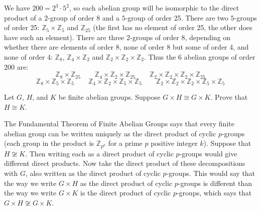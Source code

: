 \documentclass[11pt]{exam}
\def\Z{\mathbb{Z}}
\begin{document}
\begin{questions}
  \begin{solution}
  We have $200 = 2^3\cdot 5^2$, so each abelian group will be isomorphic to the direct product of a $2$-group of order 8 and a $5$-group of order 25.  There are two $5$-groups of order 25: $\Z_5\times \Z_5$ and $\Z_{25}$ (the first has no element of order 25, the other does have such an element).  There are three 2-groups of order 8, depending on whether there are elements of order 8, none of order 8 but some of order 4, and none of order 4: $\Z_8$, $\Z_4\times \Z_2$ and $\Z_2\times \Z_2 \times \Z_2$.  Thus the 6 abelian groups of order 200 are:
  \[\Z_8\times \Z_{25} \qquad \Z_4\times\Z_2\times \Z_{25} \qquad \Z_2\times\Z_2\times\Z_2 \times \Z_{25} \]
  \[\Z_8\times\Z_{5}\times\Z_5 \qquad \Z_4\times \Z_2 \times \Z_5\times\Z_5 \qquad \Z_2\times\Z_2 \times\Z_2 \times\Z_5\times\Z_5 \]

  \end{solution}

  \question[6] Let $G$, $H$, and $K$ be finite abelian groups.  Suppose $G\times H \cong G\times K$.  Prove that $H \cong K$.  %

  \begin{solution}
  The Fundamental Theorem of Finite Abelian Groups says that every finite abelian group can be written uniquely as the direct product of cyclic $p$-groups (each group in the product is $\Z_{p^k}$ for a prime $p$ positive integer $k$).  Suppose that $H \not\cong K$.  Then writing each as a direct product of cyclic $p$-groups would give different direct products.  Now take the direct product of these decompositions with $G$, also written as the direct product of cyclic $p$-groups.  This would say that the way we write $G\times H$ as the direct product of cyclic $p$-groups is different than the way we write $G \times K$ is the direct product of cyclic $p$-groups, which says that $G \times H \not\cong G \times K$.
  \end{solution}


\end{questions}
\end{document}
